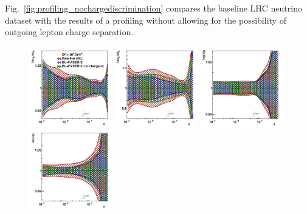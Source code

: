 
%
Fig.~\ref{fig:profiling_nochargediscrimination} compares the baseline LHC neutrino dataset with the results
of a profiling without allowing for the possibility of outgoing lepton charge separation.


\begin{figure}[t]
\centering
\includegraphics[width=0.32\textwidth]{plots/proton_fasernu2/nochargediscrimination/statOnly_FASERv2_q2_10000_pdf_uv_ratio.pdf}
\includegraphics[width=0.32\textwidth]{plots/proton_fasernu2/nochargediscrimination/statOnly_FASERv2_q2_10000_pdf_dv_ratio.pdf}
\includegraphics[width=0.32\textwidth]{plots/proton_fasernu2/nochargediscrimination/statOnly_FASERv2_q2_10000_pdf_g_ratio.pdf}\\
\includegraphics[width=0.32\textwidth]{plots/proton_fasernu2/nochargediscrimination/statOnly_FASERv2_q2_10000_pdf_Sea_ratio.pdf}

\end{figure}
